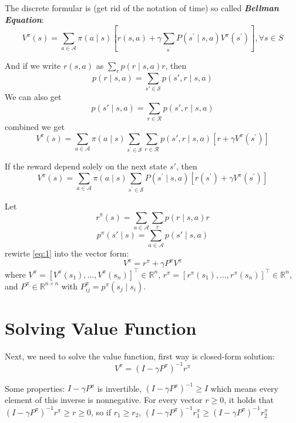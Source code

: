 \documentclass[10pt]{elegantbook}
\newcommand{\mydefination}[1]{\textbf{\textit{\textcolor{structurecolor}{#1}}}}
\begin{document}
The discrete formular is (get rid of the notation of time) so called \mydefination{Bellman Equation}:
\begin{equation} \label{eq:1}
    V^{\pi}(s) = \sum_{a \in \mathcal A}\pi(a\mid s)\left[r(s,a) + \gamma \sum_{s^{'}}P(s^{'} \mid s, a)V^{\pi}(s^{'})\right], \forall s \in S
\end{equation}

And if we write $r(s, a)$ as $\sum_r p(r \mid s, a) r$, then 
\[ p(r \mid s, a) = \sum_{s' \in \mathcal S}p(s', r \mid s, a) \]
We can also get
\[ p(s' \mid s, a) = \sum_{r \in \mathcal R} p(s', r \mid s, a) \]
combined we get
\begin{equation}
    V^{\pi}(s) = \sum_{a \in \mathcal A}\pi(a\mid s)\sum_{s^{'} \in \mathcal S}\sum_{r \in \mathcal R}p(s', r \mid s, a)\left[r + \gamma V^{\pi}(s^{'})\right]
\end{equation}

If the reward depend solely on the next state $s'$, then
\begin{equation}
    V^{\pi}(s) = \sum_{a \in \mathcal A}\pi(a\mid s)\sum_{s^{'} \in \mathcal S}P(s^{'} \mid s, a)\left[r(s^{'}) + \gamma V^{\pi}(s^{'})\right]
\end{equation}

Let 
\[ r^{\pi}(s) = \sum_{a \in \mathcal A} \sum_r p(r \mid s, a) r \] 
\[ p^{\pi}(s' \mid s) = \sum_{a \in \mathcal A} p(s' \mid s, a) \] 
rewirte \ref{eq:1} into the vector form:
\begin{equation}
    V^{\pi} = r^{\pi} + \gamma P^{\pi} V^{\pi}
\end{equation}
where $V^{\pi} = [V^{\pi}(s_1), \ldots, V^{\pi}(s_n)]^{\top} \in \mathbb R^n$, $r^{\pi} = [r^{\pi}(s_1), \ldots, r^{\pi}(s_n)]^{\top} \in \mathbb R^n$, and 
$P^{\pi} \in \mathbb R^{n \times n}$ with $P^{\pi}_{ij} = p^{\pi}(s_j \mid s_i)$.

\section{Solving Value Function}
Next, we need to solve the value function, first way is closed-form solution:
\[ V^{\pi} = \left ( I - \gamma P^{\pi} \right )^{-1} r^{\pi} \]

Some properties: $I - \gamma P^{\pi}$ is invertible, $\left ( I - \gamma P^{\pi} \right )^{-1} \geq I$ which means every element of this inverse is nonnegative.
For every vector $r \geq 0$, it holds that $\left ( I - \gamma P^{\pi} \right )^{-1} r^{\pi} \geq r \geq 0$, so if $r_1 \geq r_2$, $\left ( I - \gamma P^{\pi} \right )^{-1} r_1^{\pi} \geq
\left ( I - \gamma P^{\pi} \right )^{-1} r_2^{\pi}$
\end{document}
